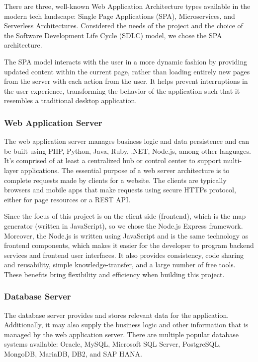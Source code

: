 There are three, well-known Web Application Architecture types available in the modern tech landscape: Single Page Applications (SPA), Microservices, and Serverless Architectures. Considered the needs of the project and the choice of the Software Development Life Cycle (SDLC) model, we chose the SPA architecture.

The SPA model interacts with the user in a more dynamic fashion by providing updated content within the current page, rather than loading entirely new pages from the server with each action from the user. It helps prevent interruptions in the user experience, transforming the behavior of the application such that it resembles a traditional desktop application.

\subsubsection{Web Application Server}
The web application server manages business logic and data persistence and can be built using PHP, Python, Java, Ruby, .NET, Node.js, among other languages. It’s comprised of at least a centralized hub or control center to support multi-layer applications. The essential purpose of a web server architecture is to complete requests made by clients for a website. The clients are typically browsers and mobile apps that make requests using secure HTTPs protocol, either for page resources or a REST API.

Since the focus of this project is on the client side (frontend), which is the map generator (written in JavaScript), so we chose the Node.js Express framework. Moreover, the Node.js is written using JavaScript and is the same technology as frontend components, which makes it easier for the developer to program backend services and frontend user interfaces. It also provides consistency, code sharing and reusability, simple knowledge-transfer, and a large number of free tools. These benefits bring flexibility and efficiency when building this project.

\subsubsection{Database Server}
The database server provides and stores relevant data for the application. Additionally, it may also supply the business logic and other information that is managed by the web application server. There are multiple popular database systems available: Oracle, MySQL, Microsoft SQL Server, PostgreSQL, MongoDB, MariaDB, DB2, and SAP HANA.

